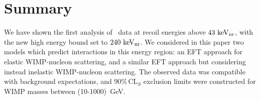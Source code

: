 \section{Summary}
We have shown the first analysis of \Xehund\ data at recoil energies above $43~\mathrm{keV_\mathrm{nr}}$, with the new high energy bound set to $240~\mathrm{keV_\mathrm{nr}}$. We considered in this paper two models which predict interactions in this energy region: an EFT approach for elastic WIMP-nucleon scattering, and a similar EFT approach but considering instead inelastic WIMP-nucleon scattering. The observed data was compatible with background expectations, and 90\%\,CL$_S$ exclusion limits were constructed for WIMP masses between (10-1000)~GeV.
